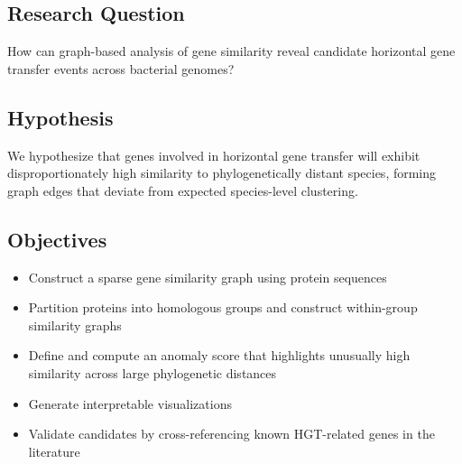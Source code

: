 \documentclass[11pt]{article}
\begin{document}
	\FloatBarrier
	
	\subsection{Research Question}
	How can graph-based analysis of gene similarity reveal candidate horizontal gene transfer events across bacterial genomes?
	
	\subsection{Hypothesis}
	We hypothesize that genes involved in horizontal gene transfer will exhibit disproportionately high similarity to phylogenetically distant species, forming graph edges that deviate from expected species-level clustering.
	
	\subsection{Objectives}
	\begin{itemize}[noitemsep, topsep=0pt]
		\item Construct a sparse gene similarity graph using protein sequences
		\item Partition proteins into homologous groups and construct within-group similarity graphs
		\item Define and compute an anomaly score that highlights unusually high similarity across large phylogenetic distances
		\item Generate interpretable visualizations
		\item Validate candidates by cross-referencing known HGT-related genes in the literature
	\end{itemize}
	
\end{document}
